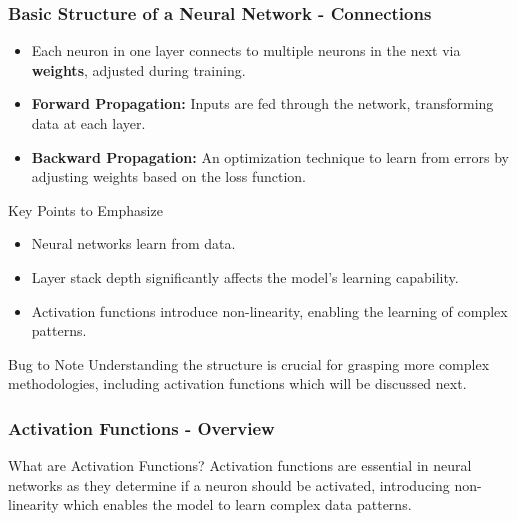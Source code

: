 \documentclass{beamer}
\begin{document}
\begin{frame}[fragile]
    \frametitle{Basic Structure of a Neural Network - Connections}
    \begin{itemize}
        \item Each neuron in one layer connects to multiple neurons in the next via \textbf{weights}, adjusted during training.
        \item \textbf{Forward Propagation:} Inputs are fed through the network, transforming data at each layer.
        \item \textbf{Backward Propagation:} An optimization technique to learn from errors by adjusting weights based on the loss function.
    \end{itemize}

    \begin{block}{Key Points to Emphasize}
        \begin{itemize}
            \item Neural networks learn from data.
            \item Layer stack depth significantly affects the model's learning capability.
            \item Activation functions introduce non-linearity, enabling the learning of complex patterns.
        \end{itemize}
    \end{block}

    \begin{block}{Bug to Note}
        Understanding the structure is crucial for grasping more complex methodologies, including activation functions which will be discussed next.
    \end{block}
\end{frame}

\begin{frame}[fragile]
    \frametitle{Activation Functions - Overview}
    \begin{block}{What are Activation Functions?}
        Activation functions are essential in neural networks as they determine if a neuron should be activated, introducing non-linearity which enables the model to learn complex data patterns.
    \end{block}
\end{frame}
\end{document}
